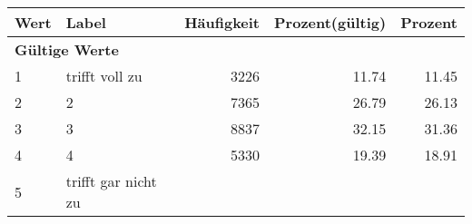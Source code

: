      \begin{longtable}{lXrrr}
     \toprule
     \textbf{Wert} & \textbf{Label} & \textbf{Häufigkeit} & \textbf{Prozent(gültig)} & \textbf{Prozent} \\
     \endhead
     \midrule
     \multicolumn{5}{l}{\textbf{Gültige Werte}}\\

     1 &
     \multicolumn{1}{X}{ trifft voll zu   } &


       \num{3226} &
       \num[round-mode=places,round-precision=2]{11,74} &
         \num[round-mode=places,round-precision=2]{11,45} \\

     2 &
     \multicolumn{1}{X}{ 2   } &


       \num{7365} &
       \num[round-mode=places,round-precision=2]{26,79} &
         \num[round-mode=places,round-precision=2]{26,13} \\

     3 &
     \multicolumn{1}{X}{ 3   } &


       \num{8837} &
       \num[round-mode=places,round-precision=2]{32,15} &
         \num[round-mode=places,round-precision=2]{31,36} \\

     4 &
     \multicolumn{1}{X}{ 4   } &


       \num{5330} &
       \num[round-mode=places,round-precision=2]{19,39} &
         \num[round-mode=places,round-precision=2]{18,91} \\

     5 &
     \multicolumn{1}{X}{ trifft gar nicht zu   } &



\end{longtable}
